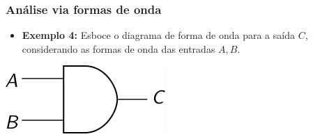 \documentclass{beamer}
\begin{document}
\begin{frame}
\frametitle{Análise via formas de onda}

\begin{itemize}
\item \textbf{Exemplo 4:} Esboce o diagrama de forma de onda para a saída
$C$, considerando as formas de onda das entradas $A,B$.
\end{itemize}
\begin{center}
\includegraphics{images/waveform3_circ}\\[6pt]
%
%
%

\end{center}
\end{frame}
\end{document}
